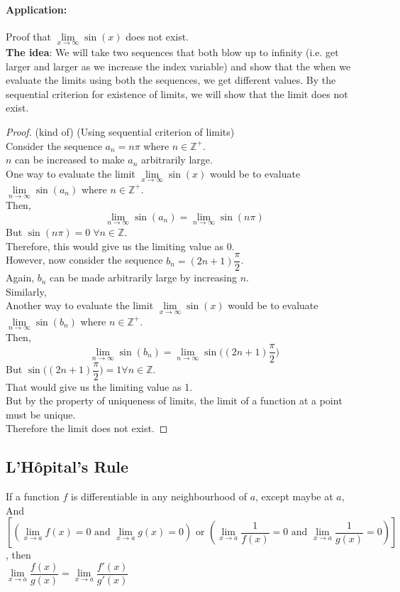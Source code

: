 \documentclass[14]{article}
\theoremstyle{definition}
\theoremstyle{case}
\begin{document}
\paragraph{Application:}
Proof that $\lim\limits_{x \to \infty} \sin(x)$ does not exist.\\
\textbf{The idea}: We will take two sequences that both blow up to infinity (i.e. get larger and larger as we increase the index variable) and show that the when we evaluate the limits using both the sequences, we get different values. By the sequential criterion for existence of limits, we will show that the limit does not exist.
\begin{proof} (kind of) (Using sequential criterion of limits)\\
Consider the sequence $a_n = n \pi$ where $n \in \mathbb{Z^+}$.\\
$n$ can be increased to make $a_n$ arbitrarily large.\\
One way to evaluate the limit $\lim\limits_{x \to \infty} \sin(x)$ would be to evaluate $\lim\limits_{n \to \infty}\sin(a_n)$ where $n \in \mathbb{Z^+}$.\\
Then,
\[\lim\limits_{n \to \infty}\sin(a_n)= \lim\limits_{n \to \infty} \sin(n\pi)\]
But $\sin(n\pi) = 0\; \forall n \in \mathbb{Z}$.\\
Therefore, this would give us the limiting value as $0$.\\
However, now consider the sequence $b_n = (2n+1)\dfrac{\pi}{2}$.\\
Again, $b_n$ can be made arbitrarily large by increasing $n$.\\
Similarly, \\Another way to evaluate the limit $\lim\limits_{x \to \infty} \sin(x)$ would be to evaluate $\lim\limits_{n \to \infty}\sin(b_n)$ where $n \in \mathbb{Z^+}$.\\
Then,
\[\lim\limits_{n\to \infty} \sin(b_n) = \lim\limits_{n \to \infty} \sin\Big((2n+1)\dfrac{\pi}{2}\Big)\]
But $\sin\Big((2n+1)\dfrac{\pi}{2}\Big) = 1 \forall n \in \mathbb{Z}$.\\
That would give us the limiting value as 1.\\
But by the property of uniqueness of limits, the limit of a function at a point must be unique.\\Therefore the limit does not exist.
\end{proof}
\subsection{L'Hôpital's Rule}
If a function $f$ is differentiable in any neighbourhood of $a$, except maybe at $a$,\\
And $\left[\left(\lim\limits_{x \to a} f(x) = 0 \text{ and }\lim\limits_{x \to a} g(x) = 0\right) \text{ or }\left(\lim\limits_{x \to a}\dfrac{1}{f(x)} = 0 \text{ and }\lim\limits_{x \to a} \dfrac{1}{g(x)} = 0\right)\right]$, then\\
$\lim\limits_{x \to a} \dfrac{f(x)}{g(x)} = \lim\limits_{x \to a} \dfrac{f'(x)}{g'(x)}$
\end{document}
